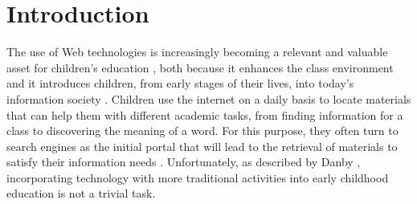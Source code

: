 \documentclass{sig-alternate-05-2015}
\begin{document}
%
%

%
%
\printccsdesc



\section{Introduction}
The use of Web technologies is increasingly becoming a relevant and valuable asset for children's education \cite{Kni14}, both because it enhances the class environment and it introduces children, from early stages of their lives, into today's information society \cite{Sad12}. Children use the internet on a daily basis to locate materials that can help them with different academic tasks, from finding information for a class to discovering the meaning of a word. For this purpose, they often turn to search engines as the initial portal that will lead to the retrieval of materials to satisfy their information needs \cite{Kni14}. Unfortunately, as described by Danby \cite{Dan13}, incorporating technology with more traditional activities into early childhood education is not a trivial task.
\end{document}
